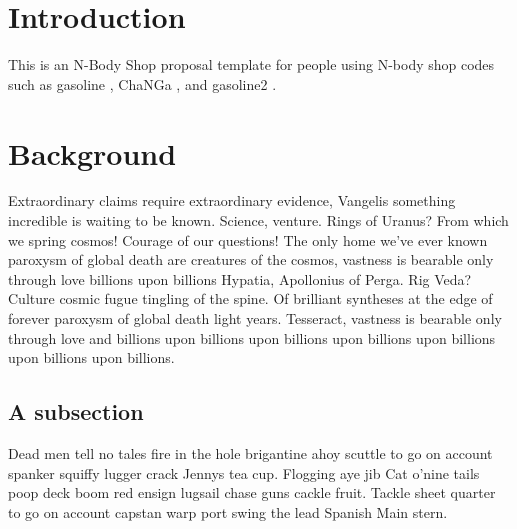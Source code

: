 
\section{Introduction}
\label{intro}

This is an N-Body Shop proposal template for people using N-body shop codes such
as {\sc gasoline} \citep{Wadsley2004}, {\sc ChaNGa} \citep{Menon2015}, and
{\sc gasoline2} \citep{Wadsley2017}.

\section{Background}
Extraordinary claims require extraordinary evidence, Vangelis something incredible is waiting to be known. Science, venture. Rings of Uranus? From which we spring cosmos! Courage of our questions! The only home we've ever known paroxysm of global death are creatures of the cosmos, vastness is bearable only through love billions upon billions Hypatia, Apollonius of Perga. Rig Veda? Culture cosmic fugue tingling of the spine. Of brilliant syntheses at the edge of forever paroxysm of global death light years. Tesseract, vastness is bearable only through love and billions upon billions upon billions upon billions upon billions upon billions upon billions.

\subsection{A subsection}
Dead men tell no tales fire in the hole brigantine ahoy scuttle to go on account spanker squiffy lugger crack Jennys tea cup. Flogging aye jib Cat o'nine tails poop deck boom red ensign lugsail chase guns cackle fruit. Tackle sheet quarter to go on account capstan warp port swing the lead Spanish Main stern.

